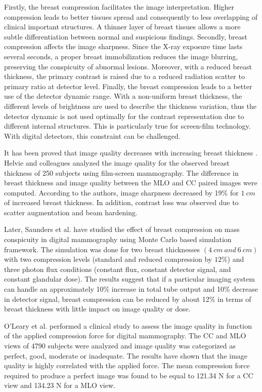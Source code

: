  Firstly, the breast compression facilitates the image interpretation. Higher compression leads to better tissues spread and consequently to less overlapping of clinical important structures. A thinner layer of breast tissues allows a more subtle differentiation between normal and suspicious findings. Secondly, breast compression affects the image sharpness. Since the X-ray exposure time lasts several seconds, a proper breast immobilization reduces the image blurring, preserving the conspicuity of abnormal lesions. Moreover, with a reduced breast thickness, the primary contrast is raised due to a reduced radiation scatter to primary ratio at detector level. Finally, the breast compression leads to a better use of the detector dynamic range. With a non-uniform breast thickness, the different levels of brightness are used to describe the thickness variation, thus the detector dynamic is not used optimally for the contrast representation due to different internal structures. This is particularly true for screen-film technology. With digital detectors, this constraint can be challenged.

It has been proved that image quality decreases with increasing breast thickness \citep{ko_dose_2013,helvie_breast_1994,saunders_effect_2008,poulos_breast_2003}. Helvie and colleagues \citep{helvie_breast_1994} analyzed the image quality for the observed breast thickness of 250 subjects using film-screen mammography.  The difference in breast thickness and image quality between the MLO and CC paired images were computed. According to the authors, image sharpness decreased by 19\% for $1\ cm$ of increased breast thickness. In addition, contrast loss was observed due to scatter augmentation and beam hardening.

Later, Saunders et al. \citep{saunders_effect_2008} have studied the effect of breast compression on mass conspicuity in digital mammography using Monte Carlo based simulation framework. The simulation was done for two breast thicknesses $(4\ cm\ and\ 6\ cm)$ with two compression levels (standard and reduced compression by $12\%$) and three photon flux conditions (constant
flux, constant detector signal, and constant glandular dose). The results suggest that if a particular imaging system can handle an approximately 10\% increase in total tube output and 10\% decrease in detector signal, breast compression can be reduced by about 12\% in terms of breast thickness with little impact on image quality or dose.

O'Leary et al. \cite{oleary_compression_2011} performed a clinical study to assess the image quality in function of the applied compression force for digital mammography. The CC and MLO views of 4790 subjects were analyzed and image quality was categorized as  perfect, good, moderate or
inadequate. The results have shown that the image quality is highly correlated with the applied force. The mean compression force required to produce a perfect image was found to be equal to 121.34 N for a CC view and 134.23 N for a MLO view.

